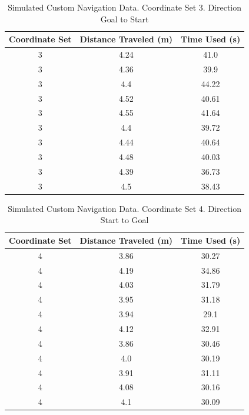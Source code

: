 \documentclass[%
paper=A4,               %
twoside=true,           %
openright,              %
11pt,                   %
bibliography=totoc,     %
titlepage=on,           %
DIV=12,                 %
BCOR=1.5cm,             %
parskip=half,            %
final
]{scrreprt}
\begin{document}
	
\begin{table}[h!]
	\centering
	\begin{tabular}{|c|c|c|}
		\hline
		Coordinate Set & Distance Traveled (m) & Time Used (s) \\
		\hline
		3 & 4.24 & 41.0 \\
		3 & 4.36 & 39.9 \\
		3 & 4.4 & 44.22 \\
		3 & 4.52 & 40.61 \\
		3 & 4.55 & 41.64 \\
		3 & 4.4 & 39.72 \\
		3 & 4.44 & 40.64 \\
		3 & 4.48 & 40.03 \\
		3 & 4.39 & 36.73 \\
		3 & 4.5 & 38.43 \\
		\hline
	\end{tabular}
	\caption{Simulated Custom Navigation Data. Coordinate Set 3. Direction Goal to Start}
	\label{tab:goal_to_start_set3}
\end{table}



	
	
	\begin{table}[h!]
		\centering
		\begin{tabular}{|c|c|c|}
			\hline
			Coordinate Set & Distance Traveled (m) & Time Used (s) \\
			\hline
			4 & 3.86 & 30.27 \\
			4 & 4.19 & 34.86 \\
			4 & 4.03 & 31.79 \\
			4 & 3.95 & 31.18 \\
			4 & 3.94 & 29.1 \\
			4 & 4.12 & 32.91 \\
			4 & 3.86 & 30.46 \\
			4 & 4.0 & 30.19 \\
			4 & 3.91 & 31.11 \\
			4 & 4.08 & 30.16 \\
			4 & 4.1 & 30.09 \\
			\hline
		\end{tabular}
		\caption{Simulated Custom Navigation Data. Coordinate Set 4. Direction Start to Goal}
		\label{tab:start_to_goal_set4}
	\end{table}
	
\end{document}
